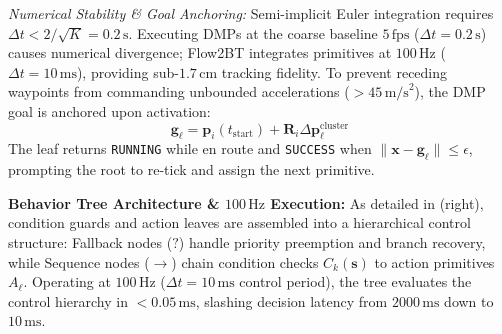 \documentclass{sice-si}
\begin{document}
\textit{Numerical Stability \& Goal Anchoring:} Semi-implicit Euler integration requires $\Delta t < 2/\sqrt{K} = 0.2\,\text{s}$. Executing DMPs at the coarse baseline $5\,\text{fps}$ ($\Delta t = 0.2\,\text{s}$) causes numerical divergence; Flow2BT integrates primitives at $100\,\text{Hz}$ ($\Delta t = 10\,\text{ms}$), providing sub-$1.7\,\text{cm}$ tracking fidelity. To prevent receding waypoints from commanding unbounded accelerations ($> 45\,\text{m/s}^2$), the DMP goal is anchored upon activation:
\begin{equation}
    \mathbf{g}_\ell = \mathbf{p}_i(t_{\text{start}}) + \mathbf{R}_i \Delta \mathbf{p}_\ell^{\text{cluster}}
\end{equation}
The leaf returns \texttt{RUNNING} while en route and \texttt{SUCCESS} when $\|\mathbf{x} - \mathbf{g}_\ell\| \le \epsilon$, prompting the root to re-tick and assign the next primitive.

\textbf{Behavior Tree Architecture \& $100\,\text{Hz}$ Execution:}
As detailed in  (right), condition guards and action leaves are assembled into a hierarchical control structure: Fallback nodes ($?$) handle priority preemption and branch recovery, while Sequence nodes ($\to$) chain condition checks $C_k(\mathbf{s})$ to action primitives $A_\ell$. Operating at $100\,\text{Hz}$ ($\Delta t = 10\,\text{ms}$ control period), the tree evaluates the control hierarchy in $< 0.05\,\text{ms}$, slashing decision latency from $2000\,\text{ms}$ down to $10\,\text{ms}$.
\end{document}

